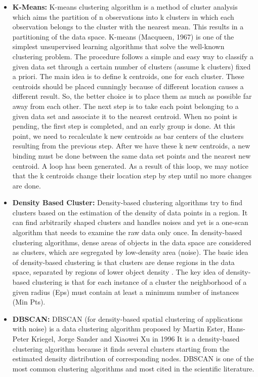 \begin{itemize}
\item    \textbf{K-Means:}
K-means clustering algorithm \cite{HitchcockKmeans} is a method of cluster analysis which aims the partition of n observations into k clusters in which each observation belongs to the cluster with the nearest mean. This results in a partitioning of the data space. K-means (Macqueen, 1967) is one of the simplest unsupervised learning algorithms that solve the well-known clustering problem. The procedure follows a simple and easy way to classify a given data set through a certain number of clusters (assume k clusters) fixed a priori. The main idea is to define k centroids, one for each cluster. These centroids should be placed cunningly because of different location causes a different result. So, the better choice is to place them as much as possible far away from each other. The next step is to take each point belonging to a given data set and associate it to the nearest centroid. When no point is pending, the first step is completed, and an early group is done. At this point, we need to recalculate k new centroids as bar centers of the clusters resulting from the previous step. After we have these k new centroids, a new binding must be done between the same data set points and the nearest new centroid. A loop has been generated. As a result of this loop, we may notice that the k centroids change their location step by step until no more changes are done.

 
\item    \textbf{Density Based Cluster:}
Density-based clustering algorithms \cite{WekaCC} try to find clusters based on the estimation of the density of data points in a region.
It can find arbitrarily shaped clusters and handles noises and yet is a one-scan algorithm that needs to examine the raw data only once. In density-based clustering algorithms, dense areas of objects in the data space are considered as clusters, which are segregated by low-density area (noise). The basic idea of density-based clustering is that clusters are dense regions in the data space, separated by regions of lower object density \cite{WEKATalankiDensity}.
The key idea of density-based clustering is that for each instance of a cluster the neighborhood of a given radius (Eps) must contain at least a minimum number of instances (Min Pts).

\item    \textbf{DBSCAN:}
DBSCAN (for density-based spatial clustering of applications with noise) is a data clustering algorithm proposed by Martin Ester, Hans-Peter Kriegel, Jorge Sander and Xiaowei Xu in 1996 It is a density-based clustering algorithm because it finds several clusters starting from the estimated density distribution of corresponding nodes. DBSCAN \cite{Kisilevich2010PDBSCANAD} is one of the most common clustering algorithms and most cited in the scientific literature.
\end{itemize}

